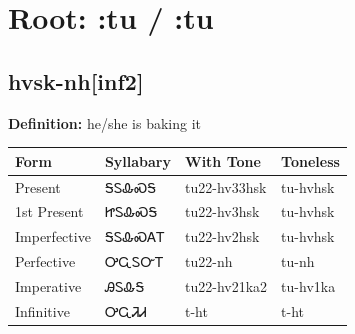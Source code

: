 \documentclass{article}%
\begin{document}
%
\normalsize%
\section*{Root: :tu / :tu}%
\subsection*{hvsk-nh[inf2]}%
\textbf{Definition: }%
he/she is baking it%
\\[0.5em]%
\begin{tabular}{|l|l|l|l|}%
\hline%
\textbf{Form}&\textbf{Syllabary}&\textbf{With Tone}&\textbf{Toneless}\\%
\hline%
Present&ᎦᏚᎲᏍᎦ&tu22{-}hv33hsk&tu{-}hvhsk\\%
1st Present&ᏥᏚᎲᏍᎦ&tu22{-}hv3hsk&tu{-}hvhsk\\%
Imperfective&ᎦᏚᎲᏍᎪᎢ&tu22{-}hv2hsk&tu{-}hvhsk\\%
Perfective&ᎤᏩᏚᏅᎢ&tu22{-}nh&tu{-}nh\\%
Imperative&ᎯᏚᎲᎦ&tu22{-}hv21ka2&tu{-}hv1ka\\%
Infinitive&ᎤᏩᏘᏗ&t{-}ht&t{-}ht\\%
\hline%
\end{tabular}%
\\[1em]%
\end{document}
